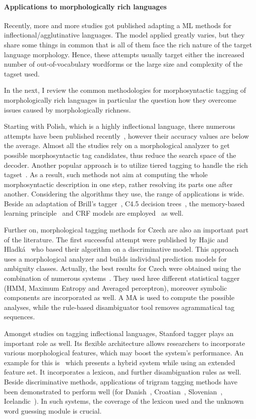 \paragraph{Applications to morphologically rich languages}

Recently, more and more studies got published adapting a ML methods for inflectional/agglutinative languages.
The model applied greatly varies, but they share some things in common that is all of them face the rich nature of the target language morphology.
Hence, these attempts usually target either the increased number of out-of-vocabulary wordforms or the large size and complexity of the tagset used.

In the next, I review the common methodologies for morphosyntactic tagging of morphologically rich languages in particular the question how they overcome issues caused by morphologically richness.

Starting with Polish, which is a highly inflectional language, there numerous attempts have been published recently~\cite{}, however their accuracy values are below the average.
Almost all the studies rely on a morphological analyzer to get possible morphosyntactic tag candidates, thus reduce the search space of the decoder.
Another popular approach is to utilize tiered tagging to handle the rich tagset~\cite{}.
As a result, such methods not aim at computing the whole morphosyntactic description in one step, rather resolving its parts one after another.
Considering the algorithms they use, the range of applications is wide.
Beside an adaptation of Brill’s tagger~\cite{}, C4.5 decision trees~\cite{}, the memory-based learning principle~\cite{} and CRF models are employed~\cite{} as well. 

Further on, morphological tagging methods for Czech are also an important part of the literature.
The first successful attempt were published by Hajic and Hladká~\cite{Hajic1998a} who based their algorithm on a discriminative model.
This approach uses a morphological analyzer and builds individual prediction models for ambiguity classes.
Actually, the best results for Czech were obtained using the combination of numerous systems~\cite{Hajic2007}.
They used hree different statistical tagger (HMM, Maximum Entropy and Averaged perceptron), moreover symbolic components are incorporated as well.
A MA is used to compute the possible analyses, while the rule-based disambiguator tool removes agrammatical tag sequences. 

Amongst studies on tagging inflectional languages, Stanford tagger plays an important role as well.
Its flexible architecture allows researchers to incorporate various morphological features, which may boost the system’s performance.
An example for this is~\cite{} which presents a hybrid system while using an extended feature set.
It incorporates a lexicon, and further disambiguation rules as well.
Beside discriminative methods, applications of trigram tagging methods have been demonstrated to perform well (for Danish~\cite{}, Croatian~\cite{}, Slovenian~\cite{}, Icelandic~\cite{}).
In such systems, the coverage of the lexicon used and the unknown word guessing module is crucial. 


